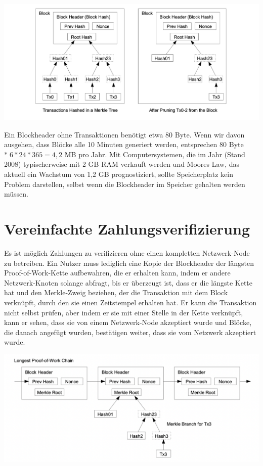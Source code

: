 \documentclass[10pt]{article}
\begin{document}
	\begin{center}
		\includegraphics[scale=0.3]{pics/reclaimingdiskspace.png}
	\end{center}
	
	Ein Blockheader ohne Transaktionen benötigt etwa 80 Byte. Wenn wir davon ausgehen, dass Blöcke alle 10 Minuten generiert werden, entsprechen 80 Byte $* \;6 * 24 * 365 = 4,2$ MB pro Jahr. Mit Computersystemen, die im Jahr (Stand 2008) typischerweise mit 2 GB RAM verkauft werden und Moores Law, das aktuell ein Wachstum von 1,2 GB prognostiziert, sollte Speicherplatz kein Problem darstellen, selbst wenn die Blockheader im Speicher gehalten werden müssen.
	
	\section{Vereinfachte Zahlungsverifizierung}
	
	Es ist möglich Zahlungen zu verifizieren ohne einen kompletten Netzwerk-Node zu betreiben. Ein Nutzer muss lediglich eine Kopie der Blockheader der längsten Proof-of-Work-Kette aufbewahren, die er erhalten kann, indem er andere Netzwerk-Knoten solange abfragt, bis er überzeugt ist, dass er die längste Kette hat und den Merkle-Zweig beziehen, der die Transaktion mit dem Block verknüpft, durch den sie einen Zeitstempel erhalten hat. Er kann die Transaktion nicht selbst prüfen, aber indem er sie mit einer Stelle in der Kette verknüpft, kann er sehen, dass sie von einem Netzwerk-Node akzeptiert wurde und Blöcke, die danach angefügt wurden, bestätigen weiter, dass sie vom Netzwerk akzeptiert wurde.
	
	\begin{center}
		\includegraphics[scale=0.35]{pics/spv.png}
	\end{center}
	
\end{document}
